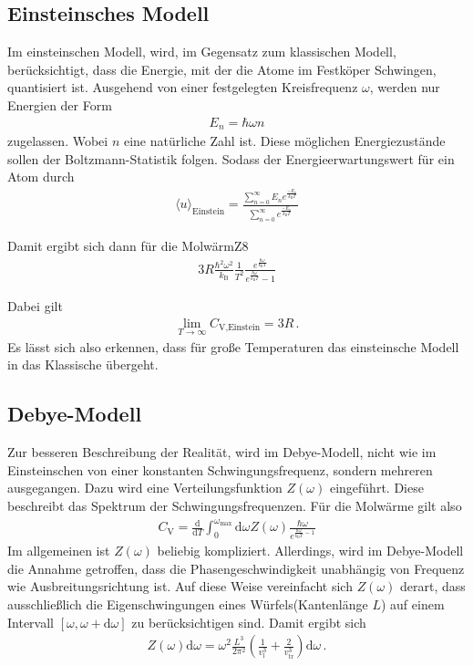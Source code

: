 \subsection{Einsteinsches Modell}
\label{subsec:einstein}
Im einsteinschen Modell, wird, im Gegensatz zum klassischen
Modell, berücksichtigt, dass die Energie, mit
der die Atome im Festköper Schwingen, quantisiert ist.
Ausgehend von einer festgelegten Kreisfrequenz $\omega$,
werden nur Energien der Form
\begin{align*}
	E_{n} = \hbar \omega n
\end{align*}
zugelassen. Wobei $n$ eine natürliche Zahl ist.
Diese möglichen Energiezustände sollen der Boltzmann-Statistik
folgen. Sodass der Energieerwartungswert für ein Atom durch
\begin{align}
	\langle u \rangle_{\text{Einstein}} = \frac{\sum^{\infty}_{n = 0}
	E_{n} e^{\frac{-E_{n}}{k_{\text{B}} T}}}{\sum^{\infty}_{n = 0}
	e^{\frac{-E_{n}}{k_{\text{B}} T}}} \label{eqn:5}
\end{align}

Damit ergibt sich dann für die MolwärmZ8
\begin{align}
	3 R \frac{\hbar^{2} \omega^{2}}{k_{\text{B}}} \frac{1}{T^{2}}
	\frac{e^{\frac{\hbar \omega}{k_{\text{B}} T}}}{e^{\frac{\hbar \omega}{k_{\text{B}} T}} - 1}\label{eqn:t7}
\end{align}

Dabei gilt
\begin{align}
	\lim_{T \rightarrow \infty} C_{\text{V,Einstein}} = 3R \, . \label{eqn:t8}
\end{align}
Es lässt sich also erkennen, dass  für große Temperaturen
das einsteinsche Modell in das Klassische übergeht.

\subsection{Debye-Modell}
\label{subsec:debye}
Zur besseren Beschreibung der Realität, wird im Debye-Modell,
nicht wie im Einsteinschen von einer konstanten Schwingungsfrequenz,
sondern mehreren ausgegangen.
Dazu wird eine Verteilungsfunktion $Z(\omega)$ eingeführt.
Diese beschreibt das Spektrum der Schwingungsfrequenzen.
Für die Molwärme gilt also
\begin{align}
	C_{\text{V}} = \frac{\mathrm{d}}{\mathrm{d}T}
	\int_{0}^{\omega_{\text{max}}} \mathrm{d}\omega Z(\omega)
	\frac{\hbar \omega}{e^{\frac{\hbar \omega}{k_{\text{B}} T} - 1}} \label{eqn:t9}
\end{align}
Im allgemeinen ist $Z(\omega)$  beliebig kompliziert.
Allerdings, wird im Debye-Modell die Annahme getroffen,
dass die Phasengeschwindigkeit unabhängig von Frequenz wie
Ausbreitungsrichtung ist.
Auf diese Weise vereinfacht sich $Z(\omega)$ derart, dass
ausschließlich die Eigenschwingungen eines Würfels(Kantenlänge $L$)
auf einem Intervall $\left[ \omega, \omega + \mathrm{d}\omega \right]$
zu berücksichtigen sind.
Damit ergibt sich
\begin{align}
	Z(\omega) \mathrm{d}\omega =  \omega^{2} \frac{L^{3}}{2 \pi^{2}}
	\left( \frac{1}{v_{\text{l}}^{3}} +
	\frac{2}{v_{\text{tr}}^{3}} \right) \mathrm{d}\omega \, . \label{eqn:t10}
\end{align}

